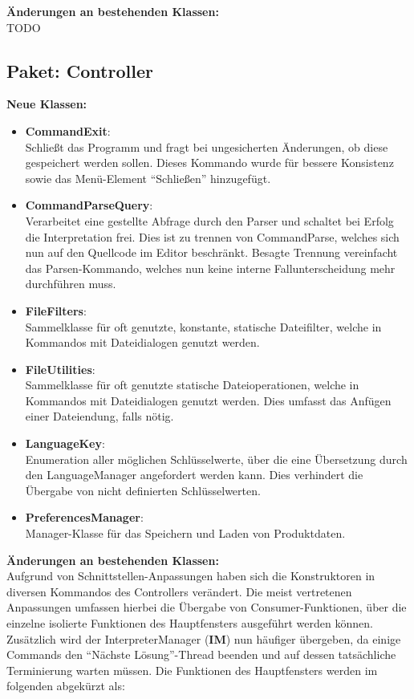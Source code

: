 \documentclass[parskip=full,11pt,twoside]{scrartcl}
\begin{document}
\textbf{Änderungen an bestehenden Klassen:}\\
TODO

\subsection{Paket: Controller}
\textbf{Neue Klassen:}\\
\begin{itemize}
	\item \textbf{CommandExit}:\\
	Schließt das Programm und fragt bei ungesicherten Änderungen, ob diese gespeichert werden sollen. Dieses Kommando wurde für bessere Konsistenz sowie das Menü-Element \enquote{Schließen} hinzugefügt.
	\item \textbf{CommandParseQuery}:\\
	Verarbeitet eine gestellte Abfrage durch den Parser und schaltet bei Erfolg die Interpretation frei. Dies ist zu trennen von CommandParse, welches sich nun auf den Quellcode im Editor beschränkt. Besagte Trennung vereinfacht das Parsen-Kommando, welches nun keine interne Fallunterscheidung mehr durchführen muss.
	\item \textbf{FileFilters}:\\
	Sammelklasse für oft genutzte, konstante, statische Dateifilter, welche in Kommandos mit Dateidialogen genutzt werden.
	\item \textbf{FileUtilities}:\\
	Sammelklasse für oft genutzte statische Dateioperationen, welche in Kommandos mit Dateidialogen genutzt werden. Dies umfasst das Anfügen einer Dateiendung, falls nötig.
	\item \textbf{LanguageKey}:\\
	Enumeration aller möglichen Schlüsselwerte, über die eine Übersetzung durch den LanguageManager angefordert werden kann. Dies verhindert die Übergabe von nicht definierten Schlüsselwerten.
	\item \textbf{PreferencesManager}:\\
	Manager-Klasse für das Speichern und Laden von Produktdaten.
\end{itemize}

\textbf{Änderungen an bestehenden Klassen:}\\
Aufgrund von Schnittstellen-Anpassungen haben sich die Konstruktoren in diversen Kommandos des Controllers verändert. Die meist vertretenen Anpassungen umfassen hierbei die Übergabe von Consumer-Funktionen, über die einzelne isolierte Funktionen des Hauptfensters ausgeführt werden können. Zusätzlich wird der InterpreterManager (\textbf{IM}) nun häufiger übergeben, da einige Commands den \enquote{Nächste Lösung}-Thread beenden und auf dessen tatsächliche Terminierung warten müssen. Die Funktionen des Hauptfensters werden im folgenden abgekürzt als:
\end{document}
